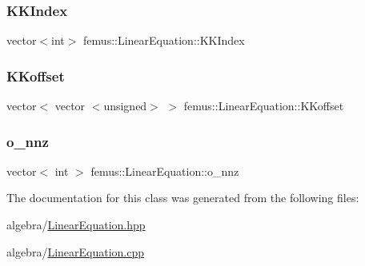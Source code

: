 \subsubsection{\texorpdfstring{K\+K\+Index}{KKIndex}}
{\footnotesize\ttfamily vector$<$int$>$ femus\+::\+Linear\+Equation\+::\+K\+K\+Index}

\mbox{\label{classfemus_1_1_linear_equation_a9cc33138c3b62897f2e249c4e4277382}} 
\subsubsection{\texorpdfstring{K\+Koffset}{KKoffset}}
{\footnotesize\ttfamily vector$<$ vector $<$unsigned$>$ $>$ femus\+::\+Linear\+Equation\+::\+K\+Koffset}

\mbox{\label{classfemus_1_1_linear_equation_af89df9c8bd0aa927ea92227044d790ea}} 
\subsubsection{\texorpdfstring{o\+\_\+nnz}{o\_nnz}}
{\footnotesize\ttfamily vector$<$ int $>$ femus\+::\+Linear\+Equation\+::o\+\_\+nnz}



The documentation for this class was generated from the following files\+:\begin{DoxyCompactItemize}
\item 
algebra/\mbox{\hyperlink{_linear_equation_8hpp}{Linear\+Equation.\+hpp}}\item 
algebra/\mbox{\hyperlink{_linear_equation_8cpp}{Linear\+Equation.\+cpp}}\end{DoxyCompactItemize}
